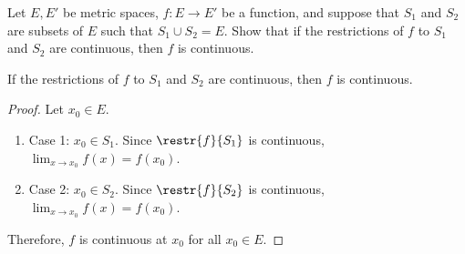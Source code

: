 \begin{problem}
  Let $E, E'$ be metric spaces, $f : E \to E'$ be a function,
  and suppose that $S_1$ and $S_2$ are subsets of $E$
  such that $S_1 \cup S_2 = E$.
  Show that if the restrictions of $f$ to $S_1$ and $S_2$ are continuous,
  then $f$ is continuous.

  \begin{answer}
    \begin{claim}
      If the restrictions of $f$ to $S_1$ and $S_2$ are continuous,
      then $f$ is continuous.
      \begin{proof}
        Let $x_0 \in E$.
        \begin{enumerate}
          \item Case 1: $x_0 \in S_1$.
            Since $\restr{f}{S_1}$ is continuous, $\displaystyle \lim_{x \to x_0}{f(x)} = f(x_0)$.
          \item Case 2: $x_0 \in S_2$.
            Since $\restr{f}{S_2}$ is continuous, $\displaystyle\lim_{x \to x_0}{f(x)} = f(x_0)$.
        \end{enumerate}
        Therefore, $f$ is continuous at $x_0$ for all $x_0 \in E$.
      \end{proof}
    \end{claim}
  \end{answer}
\end{problem}

